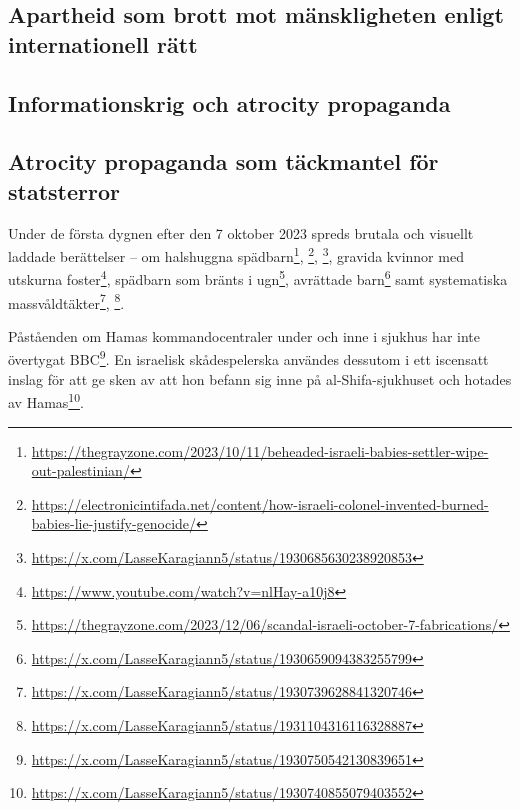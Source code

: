 

\subsection{Apartheid som brott mot mänskligheten enligt internationell rätt}



\subsection{Informationskrig och atrocity propaganda}
\subsection{Atrocity propaganda som täckmantel för statsterror}

Under de första dygnen efter den 7 oktober 2023 spreds brutala och visuellt laddade berättelser – om halshuggna spädbarn\footnote{\url{https://thegrayzone.com/2023/10/11/beheaded-israeli-babies-settler-wipe-out-palestinian/}}, 
\footnote{\url{https://electronicintifada.net/content/how-israeli-colonel-invented-burned-babies-lie-justify-genocide/}}, 
\footnote{\url{https://x.com/LasseKaragiann5/status/1930685630238920853}}, 
gravida kvinnor med utskurna foster\footnote{\url{https://www.youtube.com/watch?v=nlHay-a10j8}}, 
spädbarn som bränts i ugn\footnote{\url{https://thegrayzone.com/2023/12/06/scandal-israeli-october-7-fabrications/}}, 
avrättade barn\footnote{\url{https://x.com/LasseKaragiann5/status/1930659094383255799}} samt 
systematiska massvåldtäkter\footnote{\url{https://x.com/LasseKaragiann5/status/1930739628841320746}}, 
\footnote{\url{https://x.com/LasseKaragiann5/status/1931104316116328887}}.



Påståenden om Hamas kommandocentraler under och inne i sjukhus har inte övertygat BBC\footnote{\url{https://x.com/LasseKaragiann5/status/1930750542130839651}}. En israelisk skådespelerska användes dessutom i ett iscensatt inslag för att ge sken av att hon befann sig inne på al-Shifa-sjukhuset och hotades av Hamas\footnote{\url{https://x.com/LasseKaragiann5/status/1930740855079403552}}.

